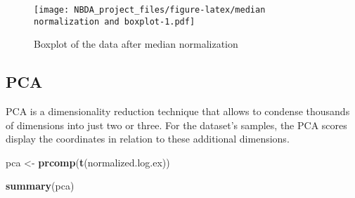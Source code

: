 \documentclass[
]{article}
\newenvironment{Shaded}{\begin{snugshade}}{\end{snugshade}}
\newcommand{\FunctionTok}[1]{\textcolor[rgb]{0.13,0.29,0.53}{\textbf{#1}}}
\newcommand{\NormalTok}[1]{#1}
\newcommand{\OtherTok}[1]{\textcolor[rgb]{0.56,0.35,0.01}{#1}}
\begin{document}
\begin{figure}
\centering
\texttt{[image: NBDA\_project\_files/figure-latex/median normalization and boxplot-1.pdf]}
\caption{Boxplot of the data after median normalization}
\end{figure}

\subsection{PCA}\label{pca}

PCA is a dimensionality reduction technique that allows to condense
thousands of dimensions into just two or three. For the dataset's
samples, the PCA scores display the coordinates in relation to these
additional dimensions.

\begin{Shaded}
\begin{Highlighting}[]
\NormalTok{pca }\OtherTok{\textless{}{-}} \FunctionTok{prcomp}\NormalTok{(}\FunctionTok{t}\NormalTok{(normalized.log.ex))}

\FunctionTok{summary}\NormalTok{(pca)}
\end{Highlighting}
\end{Shaded}
\end{document}
